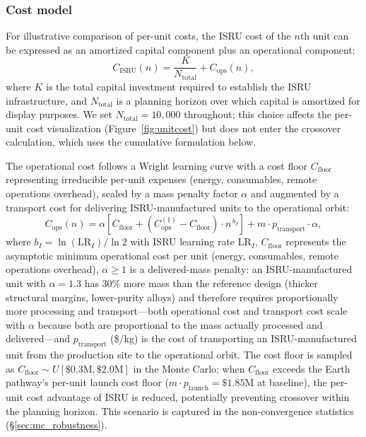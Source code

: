 \documentclass[preprint,12pt]{elsarticle}
\begin{document}
\subsubsection{Cost model}

For illustrative comparison of per-unit costs, the ISRU cost of the $n$th unit can be expressed as an amortized capital component plus an operational component:
\begin{equation}
  C_{\mathrm{ISRU}}(n) = \frac{K}{N_{\mathrm{total}}} + C_{\mathrm{ops}}(n),
  \label{eq:isru_unit}
\end{equation}
where $K$ is the total capital investment required to establish the ISRU infrastructure, and $N_{\mathrm{total}}$ is a planning horizon over which capital is amortized for display purposes. We set $N_{\mathrm{total}} = 10{,}000$ throughout; this choice affects the per-unit cost visualization (Figure~\ref{fig:unitcost}) but does not enter the crossover calculation, which uses the cumulative formulation below.

The operational cost follows a Wright learning curve with a cost floor $C_{\mathrm{floor}}$ representing irreducible per-unit expenses (energy, consumables, remote operations overhead), scaled by a mass penalty factor $\alpha$ and augmented by a transport cost for delivering ISRU-manufactured units to the operational orbit:
\begin{equation}
  C_{\mathrm{ops}}(n) = \alpha \left[ C_{\mathrm{floor}} + \left(C_{\mathrm{ops}}^{(1)} - C_{\mathrm{floor}}\right) \cdot n^{\,b_I} \right] + m \cdot p_{\mathrm{transport}} \cdot \alpha,
  \label{eq:isru_ops}
\end{equation}
where $b_I = \ln(\mathrm{LR}_I)/\ln 2$ with ISRU learning rate $\mathrm{LR}_I$, $C_{\mathrm{floor}}$ represents the asymptotic minimum operational cost per unit (energy, consumables, remote operations overhead), $\alpha \geq 1$ is a delivered-mass penalty: an ISRU-manufactured unit with $\alpha = 1.3$ has 30\% more mass than the reference design (thicker structural margins, lower-purity alloys) and therefore requires proportionally more processing and transport---both operational cost and transport cost scale with $\alpha$ because both are proportional to the mass actually processed and delivered---and $p_{\mathrm{transport}}$ (\$/kg) is the cost of transporting an ISRU-manufactured unit from the production site to the operational orbit. The cost floor is sampled as $C_{\mathrm{floor}} \sim U[\$0.3\text{M}, \$2.0\text{M}]$ in the Monte Carlo; when $C_{\mathrm{floor}}$ exceeds the Earth pathway's per-unit launch cost floor ($m \cdot p_{\mathrm{launch}} = \$1.85$M at baseline), the per-unit cost advantage of ISRU is reduced, potentially preventing crossover within the planning horizon. This scenario is captured in the non-convergence statistics (\S\ref{sec:mc_robustness}).
\end{document}
